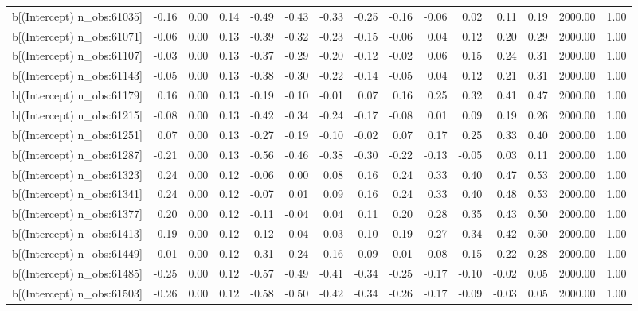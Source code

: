 \begin{table}[ht]
\begin{tabular}{rrrrrrrrrrrrrrr}
  b[(Intercept) n\_obs:61035] & -0.16 & 0.00 & 0.14 & -0.49 & -0.43 & -0.33 & -0.25 & -0.16 & -0.06 & 0.02 & 0.11 & 0.19 & 2000.00 & 1.00 \\ 
  b[(Intercept) n\_obs:61071] & -0.06 & 0.00 & 0.13 & -0.39 & -0.32 & -0.23 & -0.15 & -0.06 & 0.04 & 0.12 & 0.20 & 0.29 & 2000.00 & 1.00 \\ 
  b[(Intercept) n\_obs:61107] & -0.03 & 0.00 & 0.13 & -0.37 & -0.29 & -0.20 & -0.12 & -0.02 & 0.06 & 0.15 & 0.24 & 0.31 & 2000.00 & 1.00 \\ 
  b[(Intercept) n\_obs:61143] & -0.05 & 0.00 & 0.13 & -0.38 & -0.30 & -0.22 & -0.14 & -0.05 & 0.04 & 0.12 & 0.21 & 0.31 & 2000.00 & 1.00 \\ 
  b[(Intercept) n\_obs:61179] & 0.16 & 0.00 & 0.13 & -0.19 & -0.10 & -0.01 & 0.07 & 0.16 & 0.25 & 0.32 & 0.41 & 0.47 & 2000.00 & 1.00 \\ 
  b[(Intercept) n\_obs:61215] & -0.08 & 0.00 & 0.13 & -0.42 & -0.34 & -0.24 & -0.17 & -0.08 & 0.01 & 0.09 & 0.19 & 0.26 & 2000.00 & 1.00 \\ 
  b[(Intercept) n\_obs:61251] & 0.07 & 0.00 & 0.13 & -0.27 & -0.19 & -0.10 & -0.02 & 0.07 & 0.17 & 0.25 & 0.33 & 0.40 & 2000.00 & 1.00 \\ 
  b[(Intercept) n\_obs:61287] & -0.21 & 0.00 & 0.13 & -0.56 & -0.46 & -0.38 & -0.30 & -0.22 & -0.13 & -0.05 & 0.03 & 0.11 & 2000.00 & 1.00 \\ 
  b[(Intercept) n\_obs:61323] & 0.24 & 0.00 & 0.12 & -0.06 & 0.00 & 0.08 & 0.16 & 0.24 & 0.33 & 0.40 & 0.47 & 0.53 & 2000.00 & 1.00 \\ 
  b[(Intercept) n\_obs:61341] & 0.24 & 0.00 & 0.12 & -0.07 & 0.01 & 0.09 & 0.16 & 0.24 & 0.33 & 0.40 & 0.48 & 0.53 & 2000.00 & 1.00 \\ 
  b[(Intercept) n\_obs:61377] & 0.20 & 0.00 & 0.12 & -0.11 & -0.04 & 0.04 & 0.11 & 0.20 & 0.28 & 0.35 & 0.43 & 0.50 & 2000.00 & 1.00 \\ 
  b[(Intercept) n\_obs:61413] & 0.19 & 0.00 & 0.12 & -0.12 & -0.04 & 0.03 & 0.10 & 0.19 & 0.27 & 0.34 & 0.42 & 0.50 & 2000.00 & 1.00 \\ 
  b[(Intercept) n\_obs:61449] & -0.01 & 0.00 & 0.12 & -0.31 & -0.24 & -0.16 & -0.09 & -0.01 & 0.08 & 0.15 & 0.22 & 0.28 & 2000.00 & 1.00 \\ 
  b[(Intercept) n\_obs:61485] & -0.25 & 0.00 & 0.12 & -0.57 & -0.49 & -0.41 & -0.34 & -0.25 & -0.17 & -0.10 & -0.02 & 0.05 & 2000.00 & 1.00 \\ 
  b[(Intercept) n\_obs:61503] & -0.26 & 0.00 & 0.12 & -0.58 & -0.50 & -0.42 & -0.34 & -0.26 & -0.17 & -0.09 & -0.03 & 0.05 & 2000.00 & 1.00 \\ 

\end{tabular}
\end{table}
